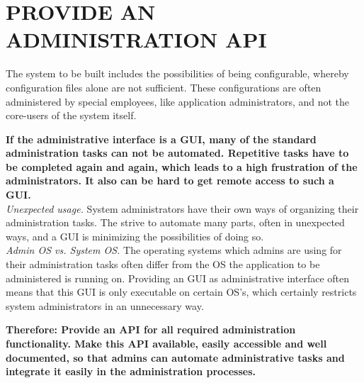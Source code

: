 \newpage
\section*{PROVIDE AN ADMINISTRATION API}

The system to be built includes the possibilities of being configurable, whereby configuration files alone are not sufficient. These configurations are often administered by special employees, like application administrators, and not the core-users of the system itself.  

\begin{center}
  
\end{center}

\textbf{If the administrative interface is a GUI, many of the standard administration tasks can not be automated. Repetitive tasks have to be completed again and again, which leads to a high frustration of the administrators. It also can be hard to get remote access to such a GUI.}\\

\textit{Unexpected usage.} System administrators have their own ways of organizing their administration tasks. The strive to automate many parts, often in unexpected ways, and a GUI is minimizing the possibilities of doing so.\\

\textit{Admin OS vs. System OS.} The operating systems which admins are using for their administration tasks often differ from the OS the application to be administered is running on. Providing an GUI as administrative interface often means that this GUI is only executable on certain OS's, which certainly restricts system administrators in an unnecessary way.

\begin{center}
   
\end{center}

\textbf{Therefore: Provide an API for all required administration functionality. Make this API available, easily accessible and well documented, so that admins can automate administrative tasks and integrate it easily in the administration processes.}\\

